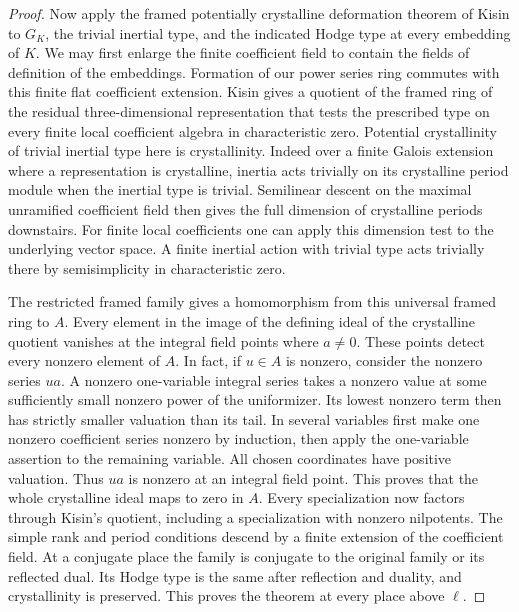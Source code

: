 \documentclass[a4paper,11pt]{article}
\theoremstyle{definition}
\theoremstyle{remark}
\numberwithin{equation}{section}
\begin{document}
\begin{proof}
Now apply the framed potentially crystalline deformation theorem
of Kisin to \(G_K\), the trivial inertial type, and the indicated
Hodge type at every embedding of \(K\). We may first enlarge
the finite coefficient field to contain the fields of definition
of the embeddings. Formation of our power series ring commutes
with this finite flat coefficient extension. Kisin gives a
quotient of the framed ring of the residual three-dimensional
representation that tests the prescribed type on every finite
local coefficient algebra in characteristic zero. Potential
crystallinity of trivial inertial type here is crystallinity.
Indeed over a finite Galois extension where a representation
is crystalline, inertia acts trivially on its crystalline
period module when the inertial type is trivial. Semilinear
descent on the maximal unramified coefficient field then gives
the full dimension of crystalline periods downstairs. For finite
local coefficients one can apply this dimension test to the
underlying vector space. A finite inertial action with trivial
type acts trivially there by semisimplicity in characteristic
zero.~\cite[Theorem 1.2.2]{VI-IV-VI-kisin121}

The restricted framed family gives a homomorphism from this
universal framed ring to \(A\). Every element in the image of
the defining ideal of the crystalline quotient vanishes at the
integral field points where \(a\ne0\). These points detect
every nonzero element of \(A\). In fact, if \(u\in A\) is
nonzero, consider the nonzero series \(ua\). A nonzero
one-variable integral series takes a nonzero value at some
sufficiently small nonzero power of the uniformizer. Its lowest
nonzero term then has strictly smaller valuation than its tail.
In several variables first make one nonzero coefficient series
nonzero by induction, then apply the one-variable assertion to
the remaining variable. All chosen coordinates have positive
valuation. Thus \(ua\) is nonzero at an integral field point.
This proves that the whole crystalline ideal maps to zero in
\(A\). Every specialization now factors through Kisin's quotient,
including a specialization with nonzero nilpotents. The simple
rank and period conditions descend by a finite extension of the
coefficient field. At a conjugate place the family is conjugate
to the original family or its reflected dual. Its Hodge type is
the same after reflection and duality, and crystallinity is
preserved. This proves the theorem at every place above \(\ell\).
\end{proof}
\end{document}
